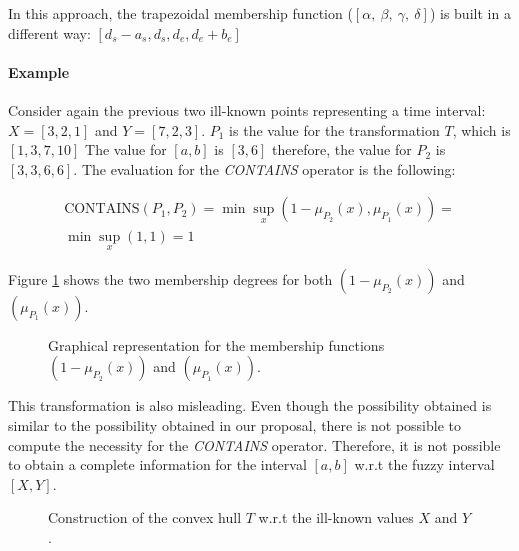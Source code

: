 \documentclass[twoside,twocolumn,a4paper]{article}
\begin{document}
In this approach, the trapezoidal membership function ($\left[\alpha,\ \beta,\ \gamma,\ \delta\right]$) is built in a different way: $\left[d_s - a_s,d_s,d_e,d_e + b_e \right]$


\paragraph{Example}
Consider again the previous two ill-known points representing a time interval:  $X = \left[3, 2, 1\right]$ and $Y = \left[7, 2, 3 \right]$.
$P_1$ is the value for the transformation $T$, which is $\left[1,3,7,10 \right]$ 
The value for $\left[a, b \right]$ is $\left[3,6 \right]$ therefore, the value for $P_2$ is $\left[3,3,6,6 \right]$. 
The evaluation for the \emph{CONTAINS} operator is the following:

\begin{eqnarray}
\nonumber
\mbox{CONTAINS}\left(P_1,P_2 \right) = \min \sup_{x} \left(1-\mu_{P_2}(x),\mu_{P_1}(x) \right) = \\
\nonumber
\min \sup_{x} \left(1,1 \right) = 1
\end{eqnarray}

Figure \ref{fig:example_ch} shows the two membership degrees for both $\left(1-\mu_{P_2}(x)\right)$ and $\left( \mu_{P_1}(x) \right)$.

\begin{figure}[h!]
  \centering
  
  \caption{Graphical representation for the membership functions $\left(1-\mu_{P_2}(x)\right)$ and $\left( \mu_{P_1}(x) \right) $.}
  \label{fig:example_ch}
\end{figure}

This transformation is also misleading. Even though the possibility obtained is similar to the possibility obtained in our proposal, there is not possible to compute the necessity for the \emph{CONTAINS} operator. Therefore, it is not possible to obtain a complete information for the interval $[a,b]$ w.r.t the fuzzy interval $[X,Y]$.

\begin{figure}[h!]
  \centering
 
  \caption{Construction of the convex hull $T$ w.r.t the ill-known values $X$ and $Y$.}
  \label{fig:convex-hull-T}
\end{figure}
\end{document}
